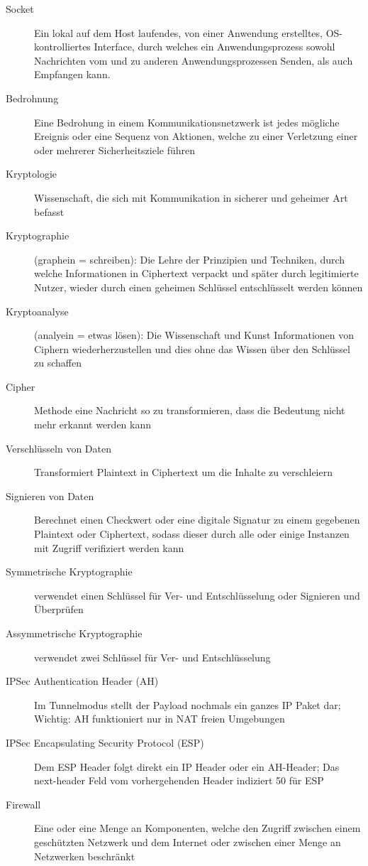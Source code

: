\documentclass[10pt,landscape]{article}
\begin{document}
\begin{multicols}{3}
\begin{description}
    \item[Socket] Ein lokal auf dem Host laufendes, von einer Anwendung erstelltes, OS-kontrolliertes Interface, durch welches ein Anwendungsprozess sowohl Nachrichten vom und zu anderen Anwendungsprozessen Senden, als auch Empfangen kann.
    \item[Bedrohnung] Eine Bedrohung in einem Kommunikationsnetzwerk ist jedes mögliche Ereignis oder eine Sequenz von Aktionen, welche zu einer Verletzung einer oder mehrerer Sicherheitsziele führen
    \item[Kryptologie] Wissenschaft, die sich mit Kommunikation in sicherer und geheimer Art befasst
    \item[Kryptographie] (graphein = schreiben): Die Lehre der Prinzipien und Techniken, durch welche Informationen in Ciphertext verpackt und später durch legitimierte Nutzer, wieder durch einen geheimen Schlüssel entschlüsselt werden können
    \item[Kryptoanalyse] (analyein = etwas lösen): Die Wissenschaft und Kunst Informationen von Ciphern wiederherzustellen und dies ohne das Wissen über den Schlüssel zu schaffen
    \item[Cipher] Methode eine Nachricht so zu transformieren, dass die Bedeutung nicht mehr erkannt werden kann
    \item[Verschlüsseln von Daten] Transformiert Plaintext in Ciphertext um die Inhalte zu verschleiern
    \item[Signieren von Daten] Berechnet einen Checkwert oder eine digitale Signatur zu einem gegebenen Plaintext oder Ciphertext, sodass dieser durch alle oder einige Instanzen mit Zugriff verifiziert werden kann
    \item[Symmetrische Kryptographie] verwendet einen Schlüssel für Ver- und Entschlüsselung oder Signieren und Überprüfen
    \item[Assymmetrische Kryptographie] verwendet zwei Schlüssel für Ver- und Entschlüsselung
    \item[IPSec Authentication Header (AH)] Im Tunnelmodus stellt der Payload nochmals ein ganzes IP Paket dar; Wichtig: AH funktioniert nur in NAT freien Umgebungen
    \item[IPSec Encapsulating Security Protocol (ESP)] Dem ESP Header folgt direkt ein IP Header oder ein AH-Header; Das next-header Feld vom vorhergehenden Header indiziert 50 für ESP
    \item[Firewall] Eine oder eine Menge an Komponenten, welche den Zugriff zwischen einem geschützten Netzwerk und dem Internet oder zwischen einer Menge an Netzwerken beschränkt

\end{description}
\end{multicols}
\end{document}
